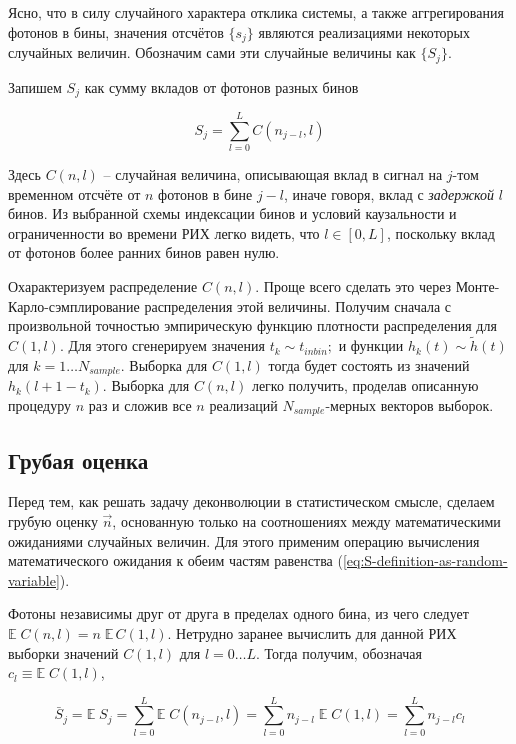 \documentclass[12pt]{book}
\begin{document}
	Ясно, что в силу случайного характера отклика системы, а также аггрегирования фотонов в бины, значения отсчётов $\{ s_j \}$ являются реализациями некоторых случайных величин. Обозначим сами эти случайные величины как $\{ S_j \}$.

	Запишем $S_j$ как сумму вкладов от фотонов разных бинов
	
	\begin{equation}
		S_j = \sum_{l=0}^{L} C(n_{j-l}, l)
		\label{eq:S-definition-as-random-variable}
	\end{equation}

	Здесь $C(n, l)$ -- случайная величина, описывающая вклад в сигнал на $j$-том временном отсчёте от $n$ фотонов в бине $j - l$, иначе говоря, вклад с \textit{задержкой} $l$ бинов. Из выбранной схемы индексации бинов и условий каузальности и ограниченности во времени РИХ легко видеть, что $l \in \left[0, L\right]$, поскольку вклад от фотонов более ранних бинов равен нулю.
	
	Охарактеризуем распределение $C(n, l)$. Проще всего сделать это через Монте-Карло-сэмплирование распределения этой величины. Получим сначала с произвольной точностью эмпирическую функцию плотности распределения для $C(1, l)$. Для этого сгенерируем значения $t_k \sim t_{inbin};$ и функции $h_k(t) \sim \tilde{h}(t)$ для $k = 1 \ldots N_{sample}$. Выборка для $C(1, l)$ тогда будет состоять из значений $h_k(l + 1 - t_k)$. Выборка для $C(n, l)$ легко получить, проделав описанную процедуру $n$ раз и сложив все $n$ реализаций $N_{sample}$-мерных векторов выборок.

	\subsection{Грубая оценка}
	\label{sec:rough-estimation}
	
	Перед тем, как решать задачу деконволюции в статистическом смысле, сделаем грубую оценку $\vec{n}$, основанную только на соотношениях между математическими ожиданиями случайных величин. Для этого применим операцию вычисления математического ожидания к обеим частям равенства (\ref{eq:S-definition-as-random-variable}).
	
	Фотоны независимы друг от друга в пределах одного бина, из чего следует $ \mathbb{E} \; C(n, l) = n \; \mathbb{E} \, C(1, l)$. Нетрудно заранее вычислить для данной РИХ выборки значений $C(1, l)$ для $l = 0 \ldots L$. Тогда получим, обозначая $c_l \equiv \mathbb{E} \; C(1, l)$,
	
	\begin{equation}
		\bar{S}_j = \mathbb{E} \; S_j = \sum_{l=0}^{L} \mathbb{E} \; C(n_{j-l}, l) = \sum_{l=0}^{L} n_{j-l} \; \mathbb{E} \; C(1, l) = \sum_{l=0}^{L} n_{j-l} c_l
	\end{equation}
\end{document}
